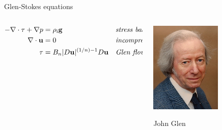 \documentclass[10pt,
               hyperref={colorlinks,citecolor=DeepPink4,linkcolor=black,urlcolor=blue},
               svgnames]{beamer}
\newcommand{\bg}{\mathbf{g}}
\newcommand{\bu}{\mathbf{u}}
\newcommand{\rhoi}{\rho_{\text{i}}}
\begin{document}
\begin{frame}{Glen-Stokes equations}

\begin{columns}
\begin{column}{0.8\textwidth}
\begin{align*}
- \nabla \cdot \tau + \nabla p &= \rhoi \bg &&\text{\emph{stress balance}} \\
\nabla \cdot \bu &= 0 &&\text{\emph{incompressibility}} \\
\tau &= B_n |D\bu|^{(1/n) - 1} D\bu  &&\text{\emph{Glen flow law}}
\end{align*}
\end{column}

\begin{column}{0.2\textwidth}

\vspace{5mm}
\hfill \includegraphics[width=0.6\textwidth]{figs/people/jglen.png}

\hfill {\tiny John Glen}
\end{column}
\end{columns}


\end{frame}
\end{document}
